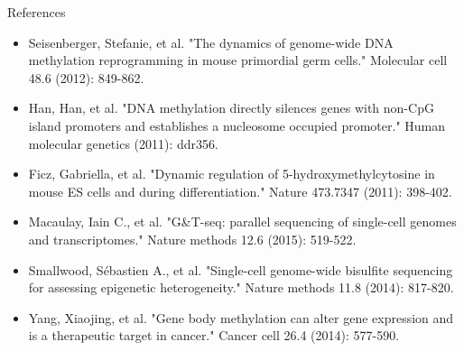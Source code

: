 \documentclass[10pt, compress]{beamer}
\renewcommand{\(}{\begin{columns}}
\renewcommand{\)}{\end{columns}}
\newcommand{\<}[1]{\begin{column}{#1}}
\renewcommand{\>}{\end{column}}
\begin{document}
\begin{frame}[fragile]
	\centering \Large {References}
	\footnotesize
	\begin{itemize}
		\item Seisenberger, Stefanie, et al. "The dynamics of genome-wide DNA methylation reprogramming in mouse primordial germ cells." Molecular cell 48.6 (2012): 849-862.
		\item Han, Han, et al. "DNA methylation directly silences genes with non-CpG island promoters and establishes a nucleosome occupied promoter." Human molecular genetics (2011): ddr356.
		\item Ficz, Gabriella, et al. "Dynamic regulation of 5-hydroxymethylcytosine in mouse ES cells and during differentiation." Nature 473.7347 (2011): 398-402. 
		\item Macaulay, Iain C., et al. "G\&T-seq: parallel sequencing of single-cell genomes and transcriptomes." Nature methods 12.6 (2015): 519-522.
		\item Smallwood, Sébastien A., et al. "Single-cell genome-wide bisulfite sequencing for assessing epigenetic heterogeneity." Nature methods 11.8 (2014): 817-820.
		\item Yang, Xiaojing, et al. "Gene body methylation can alter gene expression and is a therapeutic target in cancer." Cancer cell 26.4 (2014): 577-590.
	\end{itemize}
\end{frame}
\end{document}
